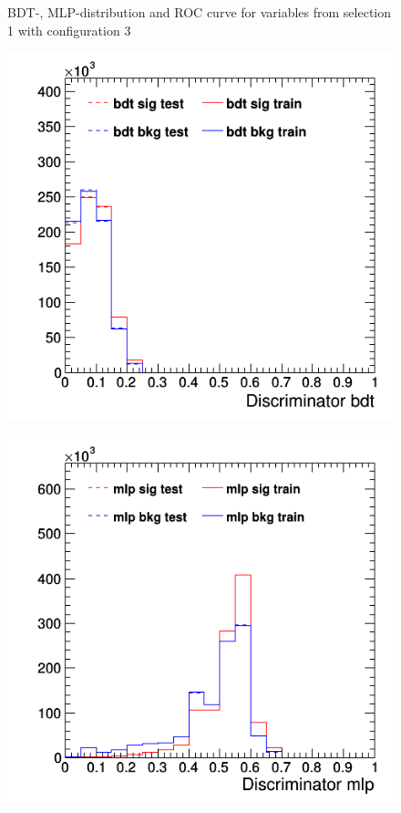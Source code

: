 \documentclass[11pt]{scrartcl}
\begin{document}
\begin{figure}[H]
	\caption{BDT-, MLP-distribution and ROC curve for variables from selection 1 with configuration 3}
	 \label{fig:ROC_s1_config3}	
	\end{figure}

	
	\begin{figure}[H]
	\centering
	\begin{minipage}{.5\textwidth}
	  \centering
	  \includegraphics[width=0.75\linewidth]{figures/MVA/select2/config1/discriminator_bdt.png}
	  \label{fig:distr_s2_config1_bdt}
	\end{minipage}%
	\begin{minipage}{.5\textwidth}
	  \centering
	  \includegraphics[width=0.75\linewidth]{figures/MVA/select2/config1/discriminator_mlp.png}

\end{minipage}
\end{figure}
\end{document}
